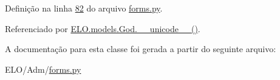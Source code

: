 Definição na linha \hyperlink{Adm_2forms_8py_source_l00082}{82} do arquivo \hyperlink{Adm_2forms_8py_source}{forms.\-py}.



Referenciado por \hyperlink{classELO_1_1models_1_1God_aec7e462406b98293c953589a3a368825}{E\-L\-O.\-models.\-God.\-\_\-\-\_\-unicode\-\_\-\-\_\-()}.



A documentação para esta classe foi gerada a partir do seguinte arquivo\-:\begin{DoxyCompactItemize}
\item 
E\-L\-O/\-Adm/\hyperlink{Adm_2forms_8py}{forms.\-py}\end{DoxyCompactItemize}

